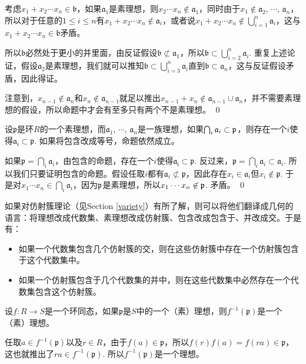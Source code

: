 	考虑$x_1+x_2\cdots x_n\in \mathfrak{b}$，如果$\mathfrak{a}_1$是素理想，则$x_2\cdots x_n\not\in \mathfrak{a}_1$，同时由于$x_1\not\in \mathfrak{a}_2$, $\cdots$, $\mathfrak{a}_n$，所以对于任意的$1\leq i \leq n$有$x_1+x_2\cdots x_n\not\in \mathfrak{a}_i$，或者说$x_1+x_2\cdots x_n\not\in \bigcup_{i=1}^n \mathfrak{a}_i$，这与$x_1+x_2\cdots x_n\in \mathfrak{b}$矛盾。

	所以$\mathfrak{b}$必然处于更小的并里面，由反证假设$\mathfrak{b}\not\subset \mathfrak{a}_1$，所以$\mathfrak{b}\subset \bigcup_{i=2}^n \mathfrak{a}_i$. 重复上述论证，假设$\mathfrak{a}_2$是素理想，我们就可以推知$\mathfrak{b}\subset \bigcup_{i=3}^n \mathfrak{a}_i$直到$\mathfrak{b}\subset \mathfrak{a}_n$，这与反证假设矛盾，因此得证。 

	注意到，$x_{n-1}\not\in \mathfrak{a}_n$和$x_{n}\not\in \mathfrak{a}_{n-1}$就足以推出$x_{n-1}+x_{n}\not\in \mathfrak{a}_{n-1}\cup \mathfrak{a}_n$，并不需要素理想的假设，所以命题中才会有至多只有两个不是素理想。
\qed

\pro 设$\mathfrak{p}$是环$R$的一个素理想，而$\mathfrak{a}_1$, $\cdots$, $\mathfrak{a}_n$是一族理想，如果$\bigcap_i \mathfrak{a}_i\subset \mathfrak{p}$，则存在一个$i$使得$\mathfrak{a_i}\subset \mathfrak{p}$. 如果将包含改成等号，命题依然成立。

\proof
	如果$\mathfrak{p}=\bigcap_i \mathfrak{a}_i$，由包含的命题，存在一个$i$使得$\mathfrak{a_i}\subset \mathfrak{p}$. 反过来，$\mathfrak{p}=\bigcap_i \mathfrak{a}_i\subset \mathfrak{a}_i$. 所以我们只要证明包含的命题。假设任取$i$都有$\mathfrak{a}_i\not\subset \mathfrak{p}$，因此存在$x_i\in\mathfrak{a}_i$但$x_i\not\in \mathfrak{p}$. 于是对$x_1\cdots x_n\in \bigcap_{i} \mathfrak{a}_i$，因为$\mathfrak{p}$是素理想，所以$x_1\cdots x_n\not\in \mathfrak{p}$. 矛盾。
\qed

\para 如果对仿射簇理论（见Section \ref{variety}）有所了解，则可以将他们翻译成几何的语言：将理想改成代数集、素理想改成仿射簇、包含改成包含于、并改成交。于是有：
\begin{itemize}
\item 如果一个代数集包含几个仿射簇的交，则在这些仿射簇中存在一个仿射簇包含于这个代数集中。
\item 如果一个仿射簇包含于几个代数集的并中，则在这些代数集中必然存在一个代数集包含这个仿射簇。
\end{itemize}

\para 设$f:R\to S$是一个环同态，如果$\mathfrak{p}$是$S$中的一个（素）理想，则$f^{-1}(\mathfrak{p})$是一个（素）理想。

\proof
	任取$a\in f^{-1}(\mathfrak{p})$以及$r\in R$，由于$f(a)\in \mathfrak{p}$，所以$f(r)f(a)=f(ra)\in \mathfrak{p}$，这也就推出了$ra\in f^{-1}(\mathfrak{p})$. 所以$f^{-1}(\mathfrak{p})$是一个理想。

